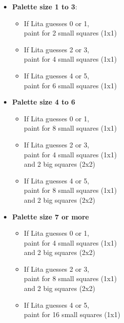 \documentclass[twocolumn]{article}
\begin{document}
{


\begin{itemize}
    \item \textbf{Palette size 1 to 3}:
    \begin{itemize}
        \item If Lita guesses 0 or 1, \\paint for 2 small squares (1x1)
        \item If Lita guesses 2 or 3, \\paint for 4 small squares (1x1)
        \item If Lita guesses 4 or 5, \\paint for 6 small squares (1x1)
    \end{itemize}
    \item \textbf{Palette size 4 to 6}
    \begin{itemize}
        \item If Lita guesses 0 or 1, \\paint for 8 small squares (1x1)
        \item If Lita guesses 2 or 3, \\paint for 4 small squares (1x1) \\and 2 big squares (2x2)
        \item If Lita guesses 4 or 5, \\paint for 8 small squares (1x1) \\and 2 big squares (2x2)
    \end{itemize}
    \item \textbf{Palette size 7 or more}
    \begin{itemize}
        \item If Lita guesses 0 or 1, \\paint for 4 small squares (1x1) \\and 2 big squares (2x2)
        \item If Lita guesses 2 or 3, \\paint for 8 small squares (1x1) \\and 2 big squares (2x2)
        \item If Lita guesses 4 or 5, \\paint for 16 small squares (1x1)
    \end{itemize}
\end{itemize}

}
\end{document}
